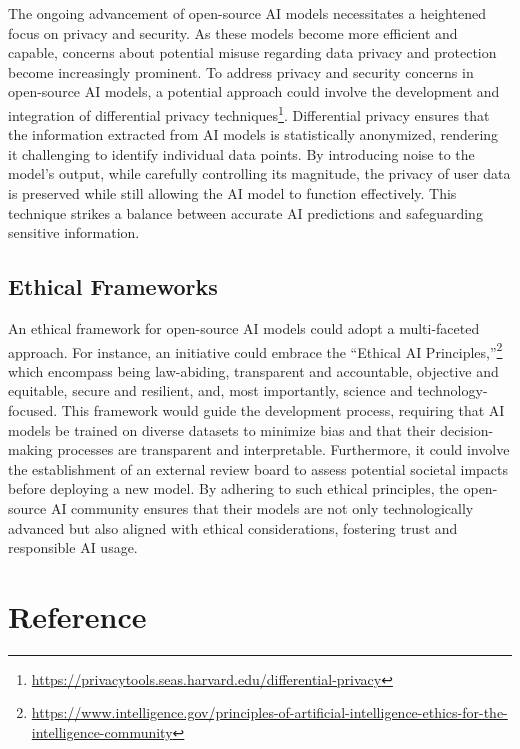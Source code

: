 \documentclass[
]{book}
\begin{document}
The ongoing advancement of open-source AI models necessitates a heightened focus on privacy and security. As these models become more efficient and capable, concerns about potential misuse regarding data privacy and protection become increasingly prominent. To address privacy and security concerns in open-source AI models, a potential approach could involve the development and integration of differential privacy techniques\footnote{\url{https://privacytools.seas.harvard.edu/differential-privacy}}. Differential privacy ensures that the information extracted from AI models is statistically anonymized, rendering it challenging to identify individual data points. By introducing noise to the model's output, while carefully controlling its magnitude, the privacy of user data is preserved while still allowing the AI model to function effectively. This technique strikes a balance between accurate AI predictions and safeguarding sensitive information.

\hypertarget{ethical-frameworks}{%
\section{Ethical Frameworks}\label{ethical-frameworks}}

An ethical framework for open-source AI models could adopt a multi-faceted approach. For instance, an initiative could embrace the ``Ethical AI Principles,''\footnote{\url{https://www.intelligence.gov/principles-of-artificial-intelligence-ethics-for-the-intelligence-community}} which encompass being law-abiding, transparent and accountable, objective and equitable, secure and resilient, and, most importantly, science and technology-focused. This framework would guide the development process, requiring that AI models be trained on diverse datasets to minimize bias and that their decision-making processes are transparent and interpretable. Furthermore, it could involve the establishment of an external review board to assess potential societal impacts before deploying a new model. By adhering to such ethical principles, the open-source AI community ensures that their models are not only technologically advanced but also aligned with ethical considerations, fostering trust and responsible AI usage.

\hypertarget{reference}{%
\chapter{Reference}\label{reference}}
\end{document}
